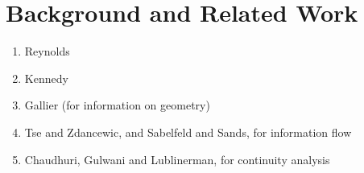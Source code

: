 \section{Background and Related Work}
\label{sec:background}

\begin{enumerate}
\item Reynolds
\item Kennedy
\item Gallier (for information on geometry)
\item Tse and Zdancewic, and Sabelfeld and Sands, for information flow
\item Chaudhuri, Gulwani and Lublinerman, for continuity analysis
\end{enumerate}

